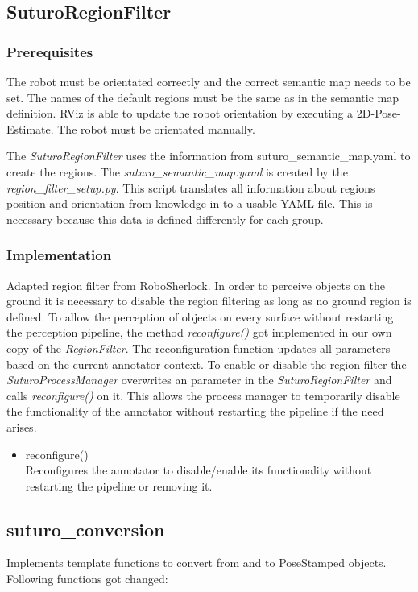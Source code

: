 \documentclass[main.tex]{subfiles}
\begin{document}
\subsection{SuturoRegionFilter}
\subsubsection{Prerequisites}
The robot must be orientated correctly and the correct semantic map needs to be set.
The names of the default regions must be the same as in the semantic map definition.
RViz is able to update the robot orientation by executing a 2D-Pose-Estimate. The robot must be orientated manually.

The \textit{SuturoRegionFilter} uses the information from suturo\_semantic\_map.yaml to create the regions. 
The \textit{suturo\_semantic\_map.yaml} is created by the \textit{region\_filter\_setup.py}. 
This script translates all information about regions position and orientation from knowledge in to a usable YAML file. 
This is necessary because this data is defined differently for each group.

\subsubsection{Implementation}
Adapted region filter from RoboSherlock. In order to perceive objects on the ground it is necessary to disable
the region filtering as long as no ground region is defined. To allow the perception of objects on every surface
without restarting the perception pipeline, the method \textit{reconfigure()} got implemented in our own copy of the 
\textit{RegionFilter}. The reconfiguration function updates all parameters based on the current annotator context.
To enable or disable the region filter the \textit{SuturoProcessManager} overwrites an parameter in the \textit{SuturoRegionFilter}
and calls \textit{reconfigure()} on it. 
This allows the process manager to temporarily disable the functionality of the annotator without restarting the pipeline if the need arises.

\begin{itemize}
\item reconfigure()\\
Reconfigures the annotator to disable/enable its functionality without restarting the pipeline or removing it.
\end{itemize}

\subsection{suturo\_conversion}
Implements template functions to convert from and to PoseStamped objects.
Following functions got changed:
\end{document}
